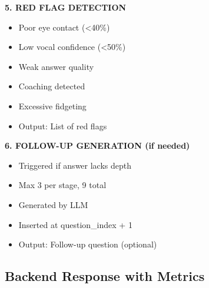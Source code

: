 \documentclass[12pt,a4paper]{article}
\begin{document}
\begin{tcolorbox}[colback=lightgray,colframe=black,title=\textbf{Multi-Modal Analysis Pipeline}]
\textbf{5. RED FLAG DETECTION}
\begin{itemize}
    \item Poor eye contact (<40\%)
    \item Low vocal confidence (<50\%)
    \item Weak answer quality
    \item Coaching detected
    \item Excessive fidgeting
    \item Output: List of red flags
\end{itemize}

\textbf{6. FOLLOW-UP GENERATION (if needed)}
\begin{itemize}
    \item Triggered if answer lacks depth
    \item Max 3 per stage, 9 total
    \item Generated by LLM
    \item Inserted at question\_index + 1
    \item Output: Follow-up question (optional)
\end{itemize}

\end{tcolorbox}

\newpage

\subsection{Backend Response with Metrics}
\end{document}
